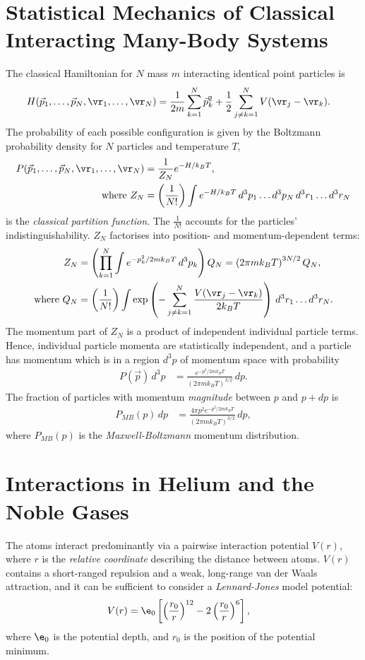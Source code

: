 \documentclass[qo.tex]{subfiles}
\begin{document}
\section{Statistical Mechanics of Classical Interacting Many-Body Systems}
The classical Hamiltonian for $N$ mass $m$ interacting identical point particles is
\begin{align}
    H(\vec{p}_1,\dots,\vec{p}_N,\vr_1,\dots,\vr_N) &= \frac{1}{2m}\sum_{k=1}^N \vec{p}_k^2 + \frac12\sum_{j\neq k=1}^N V(\vr_j-\vr_k).
\end{align}
The probability of each possible configuration is given by the Boltzmann probability density for $N$ particles and temperature $T$,
\begin{align}
    P(\vec{p}_1,\dots,\vec{p}_N,\vr_1,\dots,\vr_N) &= \frac{1}{Z_N}e^{-H/k_BT}, \\ 
    \text{where } Z_N &= \left(\frac{1}{N!}\right)\int e^{-H/k_BT}\,d^3p_1\dots d^3p_N\,d^3r_1\dots d^3r_N
\end{align}
is the \emph{classical partition function}. 
The $\frac{1}{N!}$ accounts for the particles' indistinguishability. 
$Z_N$ factorises into position- and momentum-dependent terms:
\begin{align}
    Z_N &= \left(\prod_{k=1}^N \int e^{-p_k^2/2mk_BT}\,d^3p_k\right)Q_N = \left(2\pi mk_BT\right)^{3N/2}Q_N, \\
    \text{where } Q_N &= \left(\frac{1}{N!}\right)\int \exp\left(-\sum_{j\neq k=1}^N \frac{V(\vr_j-\vr_k)}{2k_BT}\right)\,d^3r_1\dots d^3r_N.
\end{align}
The momentum part of $Z_N$ is a product of independent individual particle terms. 
Hence, individual particle momenta are statistically independent, and a particle has momentum which is in a region $d^3p$ of momentum space with probability
\begin{align}
    P(\vec{p})\,d^3p &= \frac{e^{-p^2/2mk_BT}}{(2\pi mk_BT)^{3/2}}\,dp.
\end{align}
The fraction of particles with momentum \emph{magnitude} between $p$ and $p+dp$ is
\begin{align}
    P_{MB}(p)\,dp &= \frac{4\pi p^2e^{-p^2/2mk_BT}}{(2\pi mk_BT)^{3/2}}\,dp,
\end{align}
where $P_{MB}(p)$ is the \emph{Maxwell-Boltzmann} momentum distribution.

\section{Interactions in Helium and the Noble Gases}
The atoms interact predominantly via a pairwise interaction potential $V(r)$, where $r$ is the \emph{relative coordinate} describing the distance between atoms.
$V(r)$ contains a short-ranged repulsion and a weak, long-range van der Waals attraction, and it can be sufficient to consider a \emph{Lennard-Jones} model potential:
\begin{align}
    V(r) &= \e_0\left[\left(\frac{r_0}{r}\right)^{12}-2\left(\frac{r_0}{r}\right)^6\right],
\end{align}
where $\e_0$ is the potential depth, and $r_0$ is the position of the potential minimum.
\end{document}
